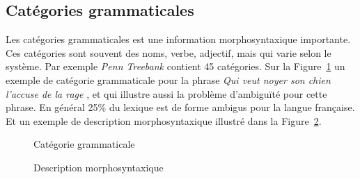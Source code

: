 \subsection{Catégories grammaticales}
Les catégories grammaticales est une information morphosyntaxique importante. Ces catégories sont souvent des noms, verbe, adjectif, mais qui varie selon le système. Par exemple \textit{Penn Treebank} contient 45 catégories. Sur la Figure~\ref{fig:categorie-grammaticale} un exemple de catégorie grammaticale pour la phrase \textit{\og Qui veut noyer son chien l’accuse de la rage \fg{}}, et qui illustre aussi la problème d’ambiguïté pour cette phrase. En général 25\% du lexique est de forme ambigus pour la langue française. Et un exemple de description morphosyntaxique illustré dans la Figure~\ref{fig:exemple-desc-morphosyntaxique}.

\begin{figure}[htbp]
    \begin{center}
    \end{center}
    \caption{Catégorie grammaticale \citep{handbook-nlp}}
    \label{fig:categorie-grammaticale}
\end{figure}

\begin{figure}[htbp]
    \begin{center}
    \end{center}
    \caption{Description morphosyntaxique \citep{handbook-nlp}}
    \label{fig:exemple-desc-morphosyntaxique}
\end{figure}

